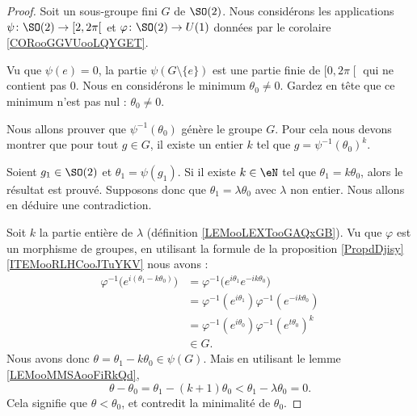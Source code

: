 \begin{proof}
    Soit un sous-groupe fini \(G\) de \( \SO(2)\). Nous considérons les applications \( \psi\colon \SO(2) \to \mathopen[ 2 , 2\pi \mathclose[\) et \( \varphi\colon \SO(2)\to U(1)\) données par le corolaire \ref{CORooGGVUooLQYGET}.

    Vu que \( \psi(e)=0\), la partie \( \psi(G\setminus\{ e \})\) est une partie finie de \( \mathopen[ 0 , 2\pi \mathclose[\) qui ne contient pas \( 0\). Nous en considérons le minimum \( \theta_0\neq 0\). Gardez en tête que ce minimum n'est pas nul : \( \theta_0\neq 0\).

        Nous allons prouver que \( \psi^{-1}(\theta_0)\) génère le groupe \( G\). Pour cela nous devons montrer que pour tout \( g\in G\), il existe un entier \( k\) tel que \( g=\psi^{-1}(\theta_0)^k\).

        Soient \( g_1\in\SO(2)\) et \( \theta_1=\psi(g_1)\). Si il existe \( k\in \eN\) tel que \( \theta_1= k\theta_0\), alors le résultat est prouvé. Supposons donc que \( \theta_1=\lambda \theta_0\) avec \( \lambda\) non entier. Nous allons en déduire une contradiction.

        Soit \( k\) la partie entière de \( \lambda\) (définition \ref{LEMooLEXTooGAQxGB}). Vu que \( \varphi\) est un morphisme de groupes, en utilisant la formule de la proposition \ref{PropdDjisy}\ref{ITEMooRLHCooJTuYKV} nous avons :
        \begin{subequations}
            \begin{align}
                \varphi^{-1}\big(  e^{i(\theta_1-k\theta_0)} \big)&=\varphi^{-1}\big(  e^{i\theta_1} e^{-ik\theta_0} \big)\\
                &=\varphi^{-1}( e^{i\theta_1})\varphi^{-1}( e^{-ik\theta_0})\\
                &=\varphi^{-1}( e^{i\theta_0})\varphi^{-1}( e^{t\theta_0})^k\\
                &\in G.
            \end{align}
        \end{subequations}
        Nous avons donc \( \theta=\theta_1-k\theta_0\in \psi(G)\). Mais en utilisant le lemme \ref{LEMooMMSAooFiRkQd},
        \begin{equation}
            \theta-\theta_0=\theta_1-(k+1)\theta_0<\theta_1-\lambda \theta_0=0.
        \end{equation}
    Cela signifie que \( \theta<\theta_0\), et contredit la minimalité de \( \theta_0\).
\end{proof}

